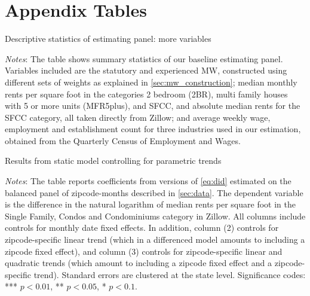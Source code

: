 
\section{Appendix Tables}

\begin{table}[h!]
	\caption{Descriptive statistics of estimating panel: more variables}
	\label{tab:estimating_panel_stats_long}
	\centering
	
	\begin{minipage}{0.95\textwidth} \footnotesize
		\vspace{3mm} 
		\textit{Notes}: The table shows summary statistics of our baseline estimating panel.
		Variables included are the statutory and experienced MW, constructed using different
		sets of weights as explained in \autoref{sec:mw_construction}; median monthly rents 
		per square foot in the categories 2 bedroom (2BR), multi family houses with 5 or more 
		units (MFR5plus), and SFCC, and absolute median rents for the SFCC category, all taken
		directly from Zillow; and average weekly wage, employment and establishment count 
		for three industries used in our estimation, obtained from the Quarterly Census of 
		Employment and Wages.
	\end{minipage}
\end{table}

\clearpage
\begin{table}[h!]
	\caption{Results from static model controlling for parametric trends}
	\label{tab:did_trend}
	\centering
	
	\begin{minipage}{0.95\textwidth} \footnotesize
		\vspace{3mm} 
		\textit{Notes}: The table reports coefficients from versions of \autoref{eq:did} 
		estimated on the balanced panel of zipcode-months described in \autoref{sec:data}. 
		The dependent variable is the difference in the natural logarithm of median	rents 
		per	square foot in the Single Family, Condos and Condominiums category in Zillow. 
		All columns include	controls for monthly date fixed effects. In addition, column 
		(2) controls for zipcode-specific linear trend (which in a differenced model 
		amounts to including a zipcode fixed effect), and column (3) controls for 
		zipcode-specific linear and	quadratic trends (which amount to including a zipcode 
		fixed effect and a zipcode-specific trend). Standard errors are clustered at 
		the state level. Significance codes: *** $p < 0.01$, ** $p < 0.05$, * $p < 0.1$.
	\end{minipage}
\end{table}

